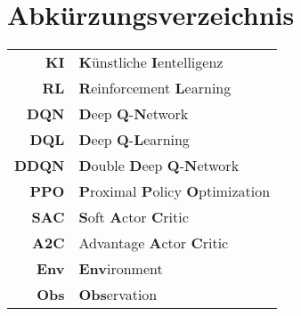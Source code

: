 \chapter{Abkürzungsverzeichnis}
\begin{center}
\begin{tabular}{rl}
\textbf{KI} & \textbf{K}ünstliche \textbf{I}entelligenz\\
\textbf{RL} & \textbf{R}einforcement \textbf{L}earning \\
\textbf{DQN} & \textbf{D}eep \textbf{Q}-\textbf{N}etwork\\
\textbf{DQL} & \textbf{D}eep \textbf{Q}-\textbf{L}earning\\
\textbf{DDQN} & \textbf{D}ouble \textbf{D}eep \textbf{Q}-\textbf{N}etwork\\
\textbf{PPO} & \textbf{P}roximal \textbf{P}olicy \textbf{O}ptimization\\
\textbf{SAC} & \textbf{S}oft \textbf{A}ctor \textbf{C}ritic\\
\textbf{A2C} & Advantage \textbf{A}ctor \textbf{C}ritic\\
\textbf{Env} & \textbf{Env}ironment \\
\textbf{Obs} & \textbf{Obs}ervation \\
\end{tabular}
\end{center}
 